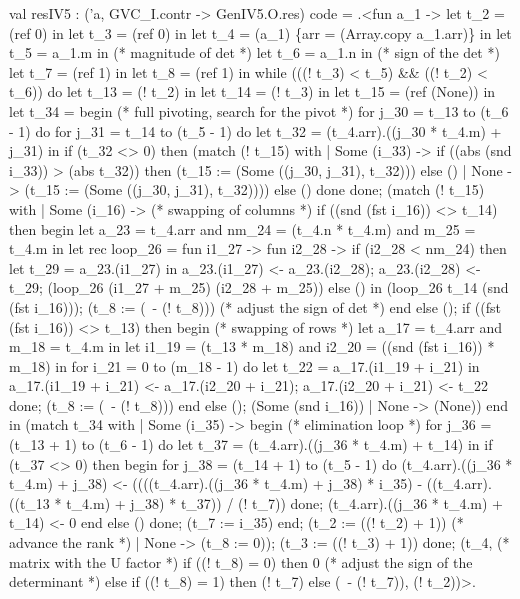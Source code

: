 \documentclass{elsart}
\begin{document}
\begin{code2}
val resIV5 : ('a, GVC_I.contr -> GenIV5.O.res) code =
  .<fun a_1 ->
   let t_2 = (ref 0) in
   let t_3 = (ref 0) in
   let t_4 = (a_1) \{arr = (Array.copy a_1.arr)\} in
   let t_5 = a_1.m in  (* magnitude of det *)
   let t_6 = a_1.n in  (* sign of the det *)
   let t_7 = (ref 1) in
   let t_8 = (ref 1) in
   while (((! t_3) < t_5) && ((! t_2) < t_6)) do
    let t_13 = (! t_2) in
    let t_14 = (! t_3) in
    let t_15 = (ref (None)) in
    let t_34 =
     begin (* full pivoting, search for the pivot *)
      for j_30 = t_13 to (t_6 - 1) do
       for j_31 = t_14 to (t_5 - 1) do
        let t_32 = (t_4.arr).((j_30 * t_4.m) + j_31) in
        if (t_32 <> 0) then
         (match (! t_15) with
          | Some (i_33) ->
             if ((abs (snd i_33)) > (abs t_32)) then
              (t_15 := (Some ((j_30, j_31), t_32)))
             else ()
          | None -> (t_15 := (Some ((j_30, j_31), t_32))))
        else ()
       done
      done;
      (match (! t_15) with
       | Some (i_16) -> (* swapping of columns *)
          if ((snd (fst i_16)) <> t_14) then begin
           let a_23 = t_4.arr
           and nm_24 = (t_4.n * t_4.m)
           and m_25 = t_4.m in
           let rec loop_26 =
            fun i1_27 ->
             fun i2_28 ->
              if (i2_28 < nm_24) then
               let t_29 = a_23.(i1_27) in
               a_23.(i1_27) <- a_23.(i2_28);
               a_23.(i2_28) <- t_29;
               (loop_26 (i1_27 + m_25) (i2_28 + m_25))
              else () in
           (loop_26 t_14 (snd (fst i_16)));
           (t_8 := (~- (! t_8))) (* adjust the sign of det *)
          end else ();
          if ((fst (fst i_16)) <> t_13) then begin (* swapping of rows *)
           let a_17 = t_4.arr
           and m_18 = t_4.m in
           let i1_19 = (t_13 * m_18)
           and i2_20 = ((snd (fst i_16)) * m_18) in
           for i_21 = 0 to (m_18 - 1) do
            let t_22 = a_17.(i1_19 + i_21) in
            a_17.(i1_19 + i_21) <- a_17.(i2_20 + i_21);
            a_17.(i2_20 + i_21) <- t_22
           done;
           (t_8 := (~- (! t_8)))
          end else ();
          (Some (snd i_16))
       | None -> (None))
     end in
    (match t_34 with
     | Some (i_35) ->
        begin (* elimination loop *)
         for j_36 = (t_13 + 1) to (t_6 - 1) do
          let t_37 = (t_4.arr).((j_36 * t_4.m) + t_14) in
          if (t_37 <> 0) then begin
           for j_38 = (t_14 + 1) to (t_5 - 1) do
            (t_4.arr).((j_36 * t_4.m) + j_38) <-
             ((((t_4.arr).((j_36 * t_4.m) + j_38) * i_35) -
                ((t_4.arr).((t_13 * t_4.m) + j_38) * t_37)) / (! t_7))
           done;
           (t_4.arr).((j_36 * t_4.m) + t_14) <- 0
          end else ()
         done;
         (t_7 := i_35)
        end;
        (t_2 := ((! t_2) + 1)) (* advance the rank *)
     | None -> (t_8 := 0));
    (t_3 := ((! t_3) + 1))
   done;
   (t_4, (* matrix with the U factor *)
    if ((! t_8) = 0) then 0 (* adjust the sign of the determinant *)
    else if ((! t_8) = 1) then (! t_7)
    else (~- (! t_7)), (! t_2))>.
\end{code2}
\end{document}
